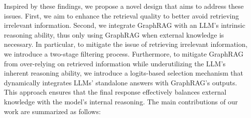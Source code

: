 \documentclass[11pt]{article}
\newcommand{\jt}[1]{{\color{red}[JT:#1]}}
\newcommand{\harry}[1]{{\color{orange}[Harry:#1]}}
\begin{document}



Inspired by these findings, we propose a novel design that aims to address these issues. First, we aim to enhance the retrieval quality to better avoid retrieving irrelevant information. Second, we integrate GraphRAG with an LLM’s intrinsic reasoning ability, thus only using GraphRAG when external knowledge is necessary. In particular, to mitigate the issue of retrieving irrelevant information, we introduce a two-stage filtering process. 
Furthermore, to mitigate GraphRAG from over-relying on retrieved information while underutilizing the LLM’s inherent reasoning ability, we introduce a logits-based selection mechanism that dynamically integrates LLMs' standalone answers with GraphRAG’s outputs. This approach ensures that the final response effectively balances external knowledge with the model’s internal reasoning. The main contributions of our work are summarized as follows:  
\end{document}
